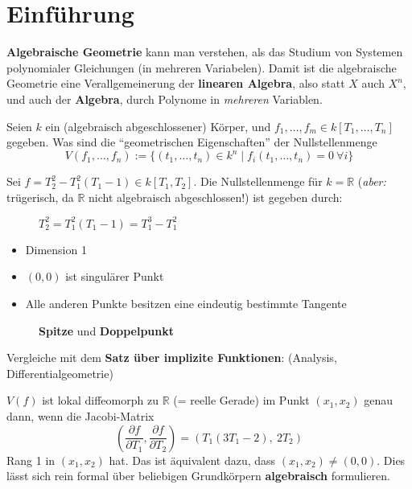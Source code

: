 
\section{Einführung}
\label{sec:einfuehrung}

\textbf{Algebraische Geometrie} kann
man verstehen, als das Studium von Systemen polynomialer Gleichungen
(in mehreren Variabelen). Damit ist die algebraische Geometrie eine
Verallgemeinerung der \textbf{linearen Algebra}, also statt $X$ auch
$X^{n}$, und auch der \textbf{Algebra}, durch Polynome in \emph{mehreren
} Variablen.
\begin{question*}
  Seien $k$ ein (algebraisch abgeschlossener) Körper, und $f_{1},\ldots,f_{m}\in k[T_{1},\ldots,T_{n}]$
  gegeben. Was sind die ``geometrischen Eigenschaften'' der Nullstellenmenge
  \[
    V(f_{1},\ldots,f_{n}):=\{(t_{1},\ldots,t_{n})\in k^{n}\mid f_{i}(t_{1},\ldots,t_{n})=0\ \forall i\}
  \]
\end{question*}
\begin{example}
  \label{bsp:einfuehrung}
  Sei $f=T_{2}^{2}-T_{1}^{2}(T_{1}-1)\in k[T_{1},T_{2}]$. Die Nullstellenmenge
  für $k=\mathbb{R}$ (\emph{aber: }trügerisch, da $\mathbb{R}$ nicht
  algebraisch abgeschlossen!) ist gegeben durch:
\end{example}
\begin{figure}
  \caption{$T_{2}^{2}=T_{1}^{2}(T_{1}-1)=T_{1}^{3}-T_{1}^{2}$}
\end{figure}


\begin{itemize}
\item Dimension 1
\item $(0,0)$ ist singulärer Punkt
\item Alle anderen Punkte besitzen eine eindeutig bestimmte Tangente
\end{itemize}


\begin{figure}[h]
  \label{fig:einfuehrung-glattheit}
  \caption{\textbf{Spitze} und \textbf{Doppelpunkt}}
\end{figure}

Vergleiche mit dem \textbf{Satz über implizite Funktionen}: (Analysis,
Differentialgeometrie) 

$V(f)$ ist lokal diffeomorph zu $\mathbb{R}$ (= reelle Gerade) im
Punkt $(x_{1},x_{2})$ genau dann, wenn die Jacobi-Matrix 
\[
  \left(\frac{\partial f}{\partial T_{1}},\frac{\partial f}{\partial T_{2}}\right)=\left(T_{1}(3T_{1}-2),\ 2T_{2}\right)
\]
Rang 1 in $(x_{1},x_{2})$ hat. Das ist äquivalent dazu, dass $(x_{1},x_{2})\neq(0,0)$.
Dies lässt sich rein formal über beliebigen Grundkörpern \textbf{algebraisch}
formulieren.

